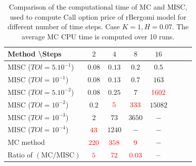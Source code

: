 \documentclass[11pt]{article}
\begin{document}
\begin{table}[h!]
	\centering
	\begin{tabular}{l*{6}{c}r}
		Method \textbackslash  Steps            & $2$ & $4$ & $8$ & $16$ &   \\
		\hline
		MISC ($TOl=5.10^{-1}$)  & $0.08$ & $0.13$ & $0.2$ & $0.5$  \\
		MISC ($TOl=10^{-1}$)  & $0.08$ & $0.13$ & $0.7$ & $163$  \\
		MISC ($TOl=5.10^{-2}$)  & $0.08$ & $0.25$ & $7$ & ${\color{red}1602}$  \\
		MISC ($TOl=10^{-2}$)  & $0.2$& ${\color{red}5}$ & ${\color{red}333}$ & $15082$  \\
		MISC ($TOl=10^{-3}$)  &  $2$ & $73$ & $3650$ & $-$  \\		
		MISC ($TOl=10^{-4}$)  & ${\color{red}43}$ & $1240$ & $-$ & $-$  \\	
		\hline
		MC method & ${\color{red}220}$  & ${\color{red}358}$  & ${\color{red}9}$ & $-$  \\
		\hline	
		Ratio of $\left(\text{MC}/ \text{MISC} \right)$  &${\color{red}5}$ & ${\color{red}   72 
		}$  & ${\color{red}  0.03	}$  & ${\color{red}-}$ \\
		\hline
	\end{tabular}
	\caption{Comparison of the computational time of  MC and MISC, used to compute Call option price of rBergomi model for different number of time steps. Case $K=1, H=0.07$. The
average MC CPU time is computed over 10 runs.}
	\label{Comparsion of the computational time of  MC and MISC, used to compute Call option price of rBergomi model for different number of time steps. Case $K=1, H=0.07$, linear}
\end{table}
\end{document}
